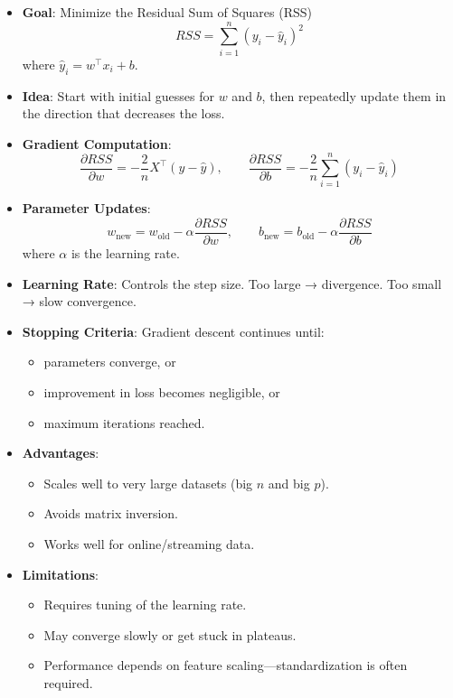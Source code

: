 \documentclass[11pt,a4paper]{article}
\begin{document}
\begin{itemize}
    \item \textbf{Goal}: Minimize the Residual Sum of Squares (RSS)
    \[
        RSS = \sum_{i=1}^{n}(y_i - \hat{y}_i)^2
    \]
    where $\hat{y}_i = w^\top x_i + b$.
    
    \item \textbf{Idea}: Start with initial guesses for $w$ and $b$, then repeatedly update them in the direction that decreases the loss.  

    \item \textbf{Gradient Computation}:
    \[
        \frac{\partial RSS}{\partial w} = -\frac{2}{n} X^\top (y - \hat{y}), 
        \qquad
        \frac{\partial RSS}{\partial b} = -\frac{2}{n} \sum_{i=1}^{n}(y_i - \hat{y}_i)
    \]

    \item \textbf{Parameter Updates}:
    \[
        w_{\text{new}} = w_{\text{old}} - \alpha \frac{\partial RSS}{\partial w}, 
        \qquad
        b_{\text{new}} = b_{\text{old}} - \alpha \frac{\partial RSS}{\partial b}
    \]
    where $\alpha$ is the learning rate.

    \item \textbf{Learning Rate}: Controls the step size.  
    Too large → divergence.  
    Too small → slow convergence.

    \item \textbf{Stopping Criteria}:  
    Gradient descent continues until:
    \begin{itemize}
        \item parameters converge, or  
        \item improvement in loss becomes negligible, or  
        \item maximum iterations reached.
    \end{itemize}

    \item \textbf{Advantages}:
    \begin{itemize}
        \item Scales well to very large datasets (big $n$ and big $p$).
        \item Avoids matrix inversion.
        \item Works well for online/streaming data.
    \end{itemize}

    \item \textbf{Limitations}:
    \begin{itemize}
        \item Requires tuning of the learning rate.
        \item May converge slowly or get stuck in plateaus.
        \item Performance depends on feature scaling—standardization is often required.
    \end{itemize}

\end{itemize}
\end{document}
